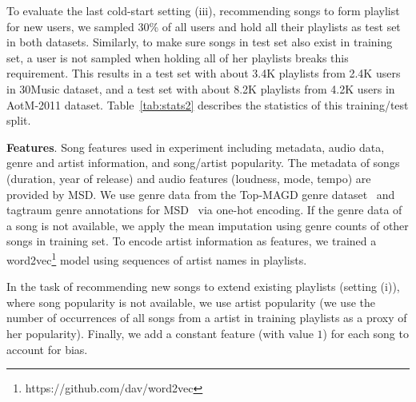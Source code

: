 To evaluate the last cold-start setting (iii), \ie recommending songs to form playlist for new users,
we sampled 30\% of all users and hold all their playlists as test set in both datasets.
Similarly, to make sure songs in test set also exist in training set,
a user is not sampled when holding all of her playlists breaks this requirement.
This results in a test set with about 3.4K playlists from 2.4K users in 30Music dataset,
and a test set with about 8.2K playlists from 4.2K users in AotM-2011 dataset.
Table~\ref{tab:stats2} describes the statistics of this training/test split.


{\bf Features}.
Song features used in experiment including metadata, audio data, genre and artist information, and song/artist popularity.
%
The metadata of songs (\eg duration, year of release) and audio features (\eg loudness, mode, tempo) are provided by MSD.
We use genre data from the Top-MAGD genre dataset~\cite{schindler2012facilitating}
and tagtraum genre annotations for MSD~\cite{schreiber2015improving} via one-hot encoding.
If the genre data of a song is not available, we apply the mean imputation using genre counts of other songs in training set.
To encode artist information as features,
we trained a word2vec\footnote{https://github.com/dav/word2vec} model using sequences of artist names in playlists.

In the task of recommending new songs to extend existing playlists (setting (i)), where song popularity is not available,
we use artist popularity (we use the number of occurrences of all songs from a artist in training playlists as a proxy of her popularity).
Finally, we add a constant feature (with value $1$) for each song to account for bias.


